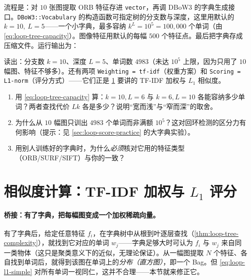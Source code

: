 \noindent 流程是：对 $10$ 张图提取 ORB 特征存进 \verb|vector|，再调 DBoW3 的字典生成接口\cite{gaoxiang2019slam14}。\verb|DBoW3::Vocabulary| 的构造函数可指定树的分支数与深度，这里用默认的 \textbf{$k=10,\ L=5$}——一个小字典，最多容纳 $k^L=10^5=100{,}000$ 个单词（由 \cref{eq:loop-tree-capacity}）。图像特征用默认的每幅 $500$ 个特征点。最后把字典存成压缩文件。运行输出为：


\noindent 读出：分支数 $k=10$、深度 $L=5$、单词数 $4983$（未达 $10^5$ 上限，因为只用了 $10$ 幅图、特征不够多）。还有两项 \verb|Weighting = tf-idf|（权重方案）和 \verb|Scoring = L1-norm|（评分方式）——它们正是 \cref{sec:loop-score} 要讲的 TF-IDF 加权与 $L_1$ 相似度。

\begin{practice}
\begin{enumerate}
  \item 用 \cref{eq:loop-tree-capacity} 算：$k=10,L=6$ 与 $k=6,L=10$ 各能容纳多少单词？两者查找代价 $Lk$ 各是多少？说明“宽而浅”与“窄而深”的取舍。
  \item 为什么从 $10$ 幅图只训出 $4983$ 个单词而非满额 $10^5$？这对回环检测的区分力有何影响（提示：见 \cref{sec:loop-score-practice} 的大字典实验）。
  \item 用别人训练好的字典时，为什么\emph{必须}核对它用的特征类型（ORB/SURF/SIFT）与你的一致？
\end{enumerate}
\end{practice}

\section{相似度计算：TF-IDF 加权与 \texorpdfstring{$L_1$}{L1} 评分}
\label{sec:loop-score}

\paragraph{桥接：有了字典，把每幅图变成一个加权稀疏向量。}
有了字典后，给定任意特征 $f_i$，在字典树中从根到叶逐层查找（\cref{thm:loop-tree-complexity}），就找到它对应的单词 $w_j$——字典足够大时可认为 $f_i$ 与 $w_j$ 来自同一类物体（这只是聚类意义下的近似，无理论保证）\cite{gaoxiang2019slam14}。从一幅图提取 $N$ 个特征、各自找到单词后，就得到该图在单词上的\emph{分布（直方图）}，即一个 Bag。但 \cref{eq:loop-l1-simple} 对所有单词一视同仁，这并不合理——本节就来修正它。

